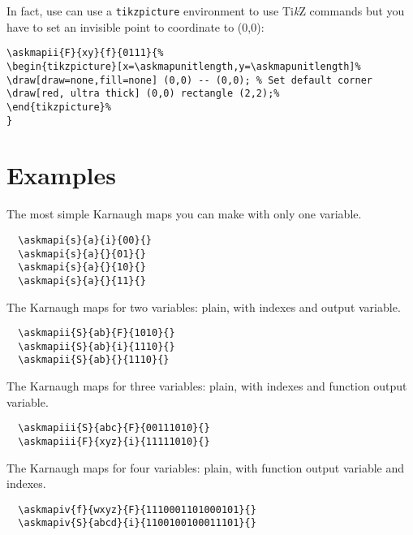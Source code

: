 \documentclass[a4paper,10pt]{ltxdoc}
\begin{document}
\bigskip
In fact, use can use a \texttt{tikzpicture} environment to use Ti\textsl{k}Z commands
but you have to set an invisible point to coordinate to (0,0):

\begin{verbatim}
\askmapii{F}{xy}{f}{0111}{%
\begin{tikzpicture}[x=\askmapunitlength,y=\askmapunitlength]%
\draw[draw=none,fill=none] (0,0) -- (0,0); % Set default corner
\draw[red, ultra thick] (0,0) rectangle (2,2);%
\end{tikzpicture}%
}
\end{verbatim}


\section{Examples}
\label{sec:examples}
\askmapunitlength=0.88cm
The most simple Karnaugh maps you can make with only one variable.
\begin{verbatim}
  \askmapi{s}{a}{i}{00}{}
  \askmapi{s}{a}{}{01}{}
  \askmapi{s}{a}{}{10}{}
  \askmapi{s}{a}{}{11}{}
\end{verbatim}
%
%
%
%
\bigskip\bigskip

The Karnaugh maps for two variables: plain, with indexes and output
variable.
\begin{verbatim}
  \askmapii{S}{ab}{F}{1010}{}
  \askmapii{S}{ab}{i}{1110}{}
  \askmapii{S}{ab}{}{1110}{}
\end{verbatim}
\bigskip\bigskip

The Karnaugh maps for three variables: plain, with indexes and function
output variable.
\begin{verbatim}
  \askmapiii{S}{abc}{F}{00111010}{}
  \askmapiii{F}{xyz}{i}{11111010}{}
\end{verbatim}
\bigskip\bigskip

The Karnaugh maps for four variables: plain, with function output variable and
indexes.
\begin{verbatim}
  \askmapiv{f}{wxyz}{F}{1110001101000101}{}
  \askmapiv{S}{abcd}{i}{1100100100011101}{}
\end{verbatim}
\bigskip\bigskip
\end{document}

